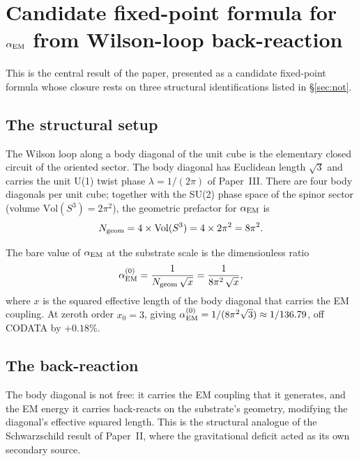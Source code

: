 \documentclass[11pt,a4paper]{article}
\begin{document}
\section{Candidate fixed-point formula for $\alpha_{\rm EM}$ from Wilson-loop back-reaction}
\label{sec:alpha-self-consistent}

This is the central result of the paper, presented as a
candidate fixed-point formula whose closure rests on three
structural identifications listed in \S\ref{sec:not}.

\subsection{The structural setup}

The Wilson loop along a body diagonal of the unit cube is the
elementary closed circuit of the oriented sector. The body
diagonal has Euclidean length $\sqrt{3}$ and carries the unit
U(1) twist phase $\lambda = 1/(2\pi)$ of Paper~III. There are
four body diagonals per unit cube; together with the SU(2)
phase space of the spinor sector (volume $\mathrm{Vol}(S^3) =
2\pi^2$), the geometric prefactor for $\alpha_{\rm EM}$ is
\begin{equation}
N_{\rm geom} = 4 \times \mathrm{Vol}(S^3)
= 4 \times 2\pi^2 = 8\pi^2.
\label{eq:Ngeom}
\end{equation}

The bare value of $\alpha_{\rm EM}$ at the substrate scale is
the dimensionless ratio
\begin{equation}
\alpha_{\rm EM}^{(0)}
= \frac{1}{N_{\rm geom}\,\sqrt{x}}
= \frac{1}{8\pi^2\,\sqrt{x}},
\label{eq:alpha-bare}
\end{equation}
where $x$ is the squared effective length of the body diagonal
that carries the EM coupling. At zeroth order $x_0 = 3$,
giving $\alpha_{\rm EM}^{(0)} = 1/(8\pi^2\sqrt{3}) \approx
1/136.79$, off CODATA by $+0.18\%$.

\subsection{The back-reaction}

The body diagonal is not free: it carries the EM coupling that
it generates, and the EM energy it carries back-reacts on the
substrate's geometry, modifying the diagonal's effective
squared length. This is the structural analogue of the
Schwarzschild result of Paper~II, where the gravitational
deficit acted as its own secondary source.
\end{document}
